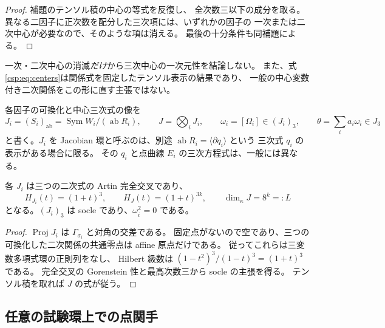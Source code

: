 \begin{proof}
補題のテンソル積の中心の等式を反復し、
全次数三以下の成分を取る。
異なる二因子に正次数を配分した三次項には、いずれかの因子の
一次または二次中心が必要なので、そのような項は消える。
最後の十分条件も同補題による。
\end{proof}

一次・二次中心の消滅\emph{だけ}から三次中心の一次元性を結論しない。
また、式\eqref{csp:eq:centers}は関係式を固定したテンソル表示の結果であり、
一般の中心変数付き二次関係をこの形に直す主張ではない。

各因子の可換化と中心三次式の像を
\begin{equation}\label{csp:eq:artin-data}
 J_i=(S_i)_{\mathrm{ab}}
       =\operatorname{Sym}W_i/(\operatorname{ab}R_i),\qquad
 J=\bigotimes_iJ_i,\qquad
 \omega_i=[\Omega_i]\in(J_i)_3,\qquad
 \theta=\sum_i a_i\omega_i\in J_3
\end{equation}
と書く。$J_i$ を Jacobian 環と呼ぶのは、別途
$\operatorname{ab}R_i=\langle\partial q_i\rangle$ という
三次式 $q_i$ の表示がある場合に限る。
その $q_i$ と点曲線 $E_i$ の三次方程式は、一般には異なる。

\begin{lemma}[可換化の長さ八の構造]
\label{csp:lem:artin}
各 $J_i$ は三つの二次式の Artin 完全交叉であり、
\begin{equation}\label{csp:eq:hilbert}
 H_{J_i}(t)=(1+t)^3,\qquad H_J(t)=(1+t)^{3k},\qquad
 \dim_\kappa J=8^k=:L
\end{equation}
となる。$(J_i)_3$ は socle であり、$\omega_i^2=0$ である。
\end{lemma}

\begin{proof}
$\operatorname{Proj}J_i$ は $\Gamma_{\sigma_i}$ と対角の交差である。
固定点がないので空であり、三つの可換化した二次関係の共通零点は
affine 原点だけである。
従ってこれらは三変数多項式環の正則列をなし、
Hilbert 級数は $(1-t^2)^3/(1-t)^3=(1+t)^3$ である。
完全交叉の Gorenstein 性と最高次数三から socle の主張を得る。
テンソル積を取れば $J$ の式が従う。
\end{proof}

\subsection{任意の試験環上での点関手}

